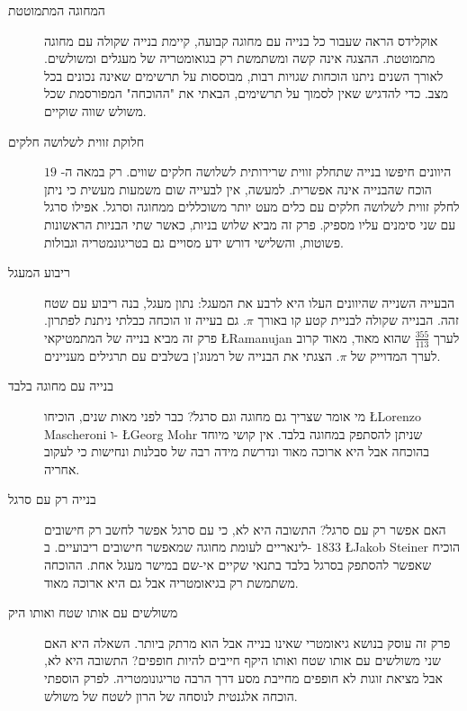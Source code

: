 \begin{description}
\item[המחוגה המתמוטטת]
אוקלידס הראה שעבור כל בנייה עם מחוגה קבועה, קיימת בנייה שקולה עם מחוגה מתמוטטת. ההצגה אינה קשה ומשתמשת רק בגואומטריה של מעגלים ומשולשים. לאורך השנים ניתנו הוכחות שגויות רבות, מבוססות על תרשימים שאינה נכונים בכל מצב. כדי להדגיש שאין לסמוך על תרשימים, הבאתי את "ההוכחה" המפורסמת שכל משולש שווה שוקיים.
\item[חלוקת זווית לשלושה חלקים]
היוונים חיפשו בנייה שתחלק זווית שרירותית לשלושה חלקים שווים. רק במאה ה-%
$19$
הוכח שהבנייה אינה אפשרית. למעשה, אין לבעייה שום משמעות מעשית כי ניתן לחלק זווית לשלושה חלקים עם כלים מעט יותר משוכללים ממחוגה וסרגל. אפילו סרגל עם שני סימנים עליו מספיק. פרק זה מביא שלוש בניות, כאשר שתי הבניות הראשונות פשוטות, והשלישי דורש ידע מסויים גם בטריגונמטריה וגבולות.

\item[ריבוע המעגל]
הבעייה השנייה שהיוונים העלו היא לרבע את המעגל: נתון מעגל, בנה ריבוע עם שטח זהה. הבנייה שקולה לבניית קטע קו באורך 
$\pi$.
גם בעייה זו הוכחה כבלתי ניתנת לפתרון. פרק זה מביא בנייה של המתמטיקאי
\L{Ramanujan}
לערך
$\displaystyle\frac{355}{113}$
שהוא מאוד, מאוד קרוב לערך המדוייק של
$\pi$.
הצגתי את הבנייה של רמנוג'ן בשלבים עם תרגילים מעניינים.

\item[בנייה עם מחוגה בלבד]
מי אומר שצריך גם מחוגה וגם סרגל? כבר לפני מאות שנים, הוכיחו
\L{Lorenzo Mascheroni}
ו-%
\L{Georg Mohr}
שניתן להסתפק במחוגה בלבד. אין קושי מיוחד בהוכחה אבל היא ארוכה מאוד ונדרשת מידה רבה של סבלנות ונחישות כי לעקוב אחריה.

\item[בנייה רק עם סרגל]
האם אפשר רק עם סרגל? התשובה היא לא, כי עם סרגל אפשר לחשב רק חישובים לינאריים לעומת מחוגה שמאפשר חישובים ריבועיים. ב-%
$1833$
\L{Jakob Steiner}
הוכיח שאפשר להסתפק בסרגל בלבד בתנאי שקיים אי-שם במישר מעגל אחת. ההוכחה משתמשת רק בגיאומטריה אבל גם היא ארוכה מאוד.

\item[משולשים עם אותו שטח ואותו היק]
פרק זה עוסק בנושא גיאומטרי שאינו בנייה אבל הוא מרתק ביותר. השאלה היא האם שני משולשים עם אותו שטח ואותו היקף חייבים להיות חופפים? התשובה היא לא, אבל מציאת זוגות לא חופפים מחייבת מסע דרך הרבה טריגונומטריה. לפרק הוספתי הוכחה אלגנטית לנוסחה של הרון לשטח של משולש.

\end{description}

